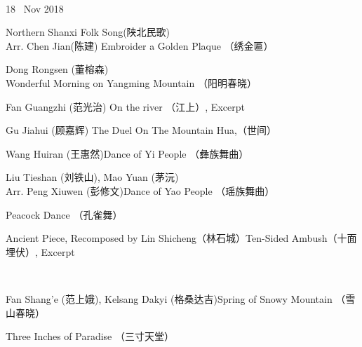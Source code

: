 \documentclass[letter,6pt,poets]{ConcProg}
\begin{document}
\begin{spacing}{0.85}
\begin{programme}{
\\  {\normalsize 18 ~Nov 2018}
}
\begin{part}[]
    \begin{composition}{Northern Shanxi Folk Song(陕北民歌)\\Arr. Chen Jian(陈建)} {}{Embroider a Golden Plaque  （绣金匾）}{}
    \end{composition}
    \begin{composition}{Dong Rongsen (董榕森)} {}{Wonderful Morning on Yangming Mountain  （阳明春晓）
}{}
    \end{composition}
    \begin{composition}{Fan Guangzhi (范光治)} {}{On the river （江上）, Excerpt}{}
                   {}{}
    \end{composition}
     \begin{composition}{Gu Jiahui (顾嘉辉)} {}{The Duel On The Mountain Hua,（世间）}{}
                   {}{}
    \end{composition}    
    \begin{composition}{Wang Huiran (王惠然)}{}{Dance of Yi People  （彝族舞曲）}{}
                   {}{}
    \end{composition}
    \begin{composition}{Liu Tieshan (刘铁山), Mao Yuan (茅沅) \\Arr. Peng Xiuwen (彭修文)}{}{Dance of Yao People  （瑶族舞曲）}{}
    \end{composition}
    \begin{composition}{}{}{Peacock Dance （孔雀舞） }{}
                   {}{}
    \end{composition}
    \begin{composition}{Ancient Piece, Recomposed by Lin Shicheng（林石城）}{}{Ten-Sided Ambush（十面埋伏）, Excerpt}{}
    \end{composition}\\
    \begin{composition}{Fan Shang'e (范上娥), Kelsang Dakyi (格桑达吉)}{}{Spring of Snowy Mountain   （雪山春晓）}{}
                   {}{}
    \end{composition}
    \begin{composition}{}{}{Three Inches of Paradise  （三寸天堂）}{}

\end{composition}
\end{part}
\end{programme}
\end{spacing}
\end{document}
